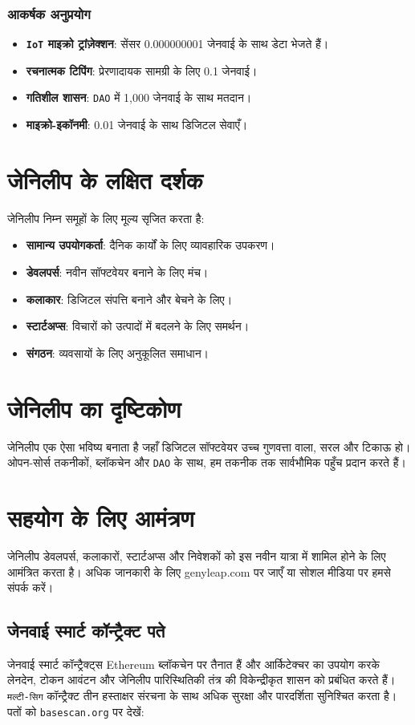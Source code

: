 \documentclass[a4paper,12pt,openany]{book}
\begin{document}
\subsection*{आकर्षक अनुप्रयोग}
\begin{itemize}
    \item \textbf{\texttt{IoT} माइक्रो ट्रांज़ेक्शन}: सेंसर 0.000000001 जेनवाई के साथ डेटा भेजते हैं।
    \item \textbf{रचनात्मक टिपिंग}: प्रेरणादायक सामग्री के लिए 0.1 जेनवाई।
    \item \textbf{गतिशील शासन}: \texttt{DAO} में 1,000 जेनवाई के साथ मतदान।
    \item \textbf{माइक्रो-इकॉनमी}: 0.01 जेनवाई के साथ डिजिटल सेवाएँ।
\end{itemize}

\chapter{जेनिलीप के लक्षित दर्शक}
जेनिलीप निम्न समूहों के लिए मूल्य सृजित करता है:
\begin{itemize}
    \item \textbf{सामान्य उपयोगकर्ता}: दैनिक कार्यों के लिए व्यावहारिक उपकरण।
    \item \textbf{डेवलपर्स}: नवीन सॉफ्टवेयर बनाने के लिए मंच।
    \item \textbf{कलाकार}: डिजिटल संपत्ति बनाने और बेचने के लिए।
    \item \textbf{स्टार्टअप्स}: विचारों को उत्पादों में बदलने के लिए समर्थन।
    \item \textbf{संगठन}: व्यवसायों के लिए अनुकूलित समाधान।
\end{itemize}

\chapter{जेनिलीप का दृष्टिकोण}
जेनिलीप एक ऐसा भविष्य बनाता है जहाँ डिजिटल सॉफ्टवेयर उच्च गुणवत्ता वाला, सरल और टिकाऊ हो। ओपन-सोर्स तकनीकों, ब्लॉकचेन और \texttt{DAO} के साथ, हम तकनीक तक सार्वभौमिक पहुँच प्रदान करते हैं।

\chapter{सहयोग के लिए आमंत्रण}
जेनिलीप डेवलपर्स, कलाकारों, स्टार्टअप्स और निवेशकों को इस नवीन यात्रा में शामिल होने के लिए आमंत्रित करता है। अधिक जानकारी के लिए genyleap.com पर जाएँ या सोशल मीडिया पर हमसे संपर्क करें।

\section*{जेनवाई स्मार्ट कॉन्ट्रैक्ट पते}
जेनवाई स्मार्ट कॉन्ट्रैक्ट्स Ethereum ब्लॉकचेन पर तैनात हैं और  आर्किटेक्चर का उपयोग करके लेनदेन, टोकन आवंटन और जेनिलीप पारिस्थितिकी तंत्र की विकेन्द्रीकृत शासन को प्रबंधित करते हैं। \texttt{मल्टी-सिग} कॉन्ट्रैक्ट तीन हस्ताक्षर संरचना के साथ अधिक सुरक्षा और पारदर्शिता सुनिश्चित करता है। पतों को \texttt{basescan.org} पर देखें:
\end{document}
